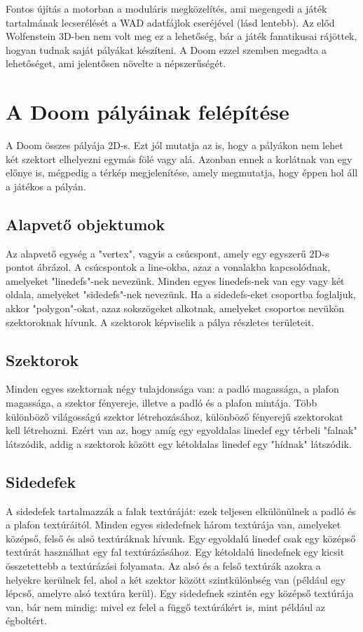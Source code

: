 \documentclass{thesis-ekf}
\theoremstyle{definition}
\theoremstyle{remark}
\begin{document}
Fontos újítás a motorban a moduláris megközelítés, ami megengedi a játék
tartalmának lecserélését a WAD adatfájlok cseréjével (lásd lentebb). Az előd
Wolfenstein 3D-ben nem volt meg ez a lehetőség, bár a játék fanatikusai
rájöttek, hogyan tudnak saját pályákat készíteni. A Doom ezzel szemben megadta
a lehetőséget, ami jelentősen növelte a népszerűségét.

\section{A Doom pályáinak felépítése}

A Doom összes pályája 2D-s. Ezt jól mutatja az is, hogy a pályákon nem lehet két
szektort elhelyezni egymás fölé vagy alá. Azonban ennek a korlátnak van egy
előnye is, mégpedig a térkép megjelenítése, amely megmutatja, hogy éppen hol áll
a játékos a pályán.

\subsection{Alapvető objektumok}

Az alapvető egység a "vertex", vagyis a csúcspont, amely egy egyszerű 2D-s
pontot ábrázol. A csúcspontok a line-okba, azaz a vonalakba kapcsolódnak,
amelyeket "linedefs"-nek nevezünk. Minden egyes linedefs-nek van egy vagy két
oldala, amelyeket "sidedefs"-nek nevezünk. Ha a sidedefs-eket csoportba
foglaljuk, akkor "polygon"-okat, azaz sokszögeket alkotnak, amelyeket csoportos
nevükön szektoroknak hívunk. A szektorok képviselik a pálya részletes
területeit.

\subsection{Szektorok}

Minden egyes szektornak négy tulajdonsága van: a padló magassága, a plafon
magassága, a szektor fényereje, illetve a padló és a plafon mintája. Több
különböző világosságú szektor létrehozásához, különböző fényerejű szektorokat
kell létrehozni. Ezért van az, hogy amíg egy egyoldalas linedef egy térbeli
"falnak" látszódik, addig a szektorok között egy kétoldalas linedef egy
"hídnak" látszódik.

\subsection{Sidedefek}

A sidedefek tartalmazzák a falak textúráját: ezek teljesen elkülönülnek a padló
és a plafon textúráitól. Minden egyes sidedefnek három textúrája van, amelyeket
középső, felső és alsó textúráknak hívunk. Egy egyoldalú linedef csak egy
középső textúrát használhat egy fal textúrázásához. Egy kétoldalú linedefnek egy
kicsit összetettebb a textúrázási folyamata. Az alsó és a felső textúrák azokra
a helyekre kerülnek fel, ahol a két szektor között szintkülönbség van (például
egy lépcső, amelyre alsó textúra kerül). Egy sidedefnek szintén egy középső
textúrája van, bár nem mindig: mivel ez felel a függő textúrákért is, mint
például az égboltért.
\end{document}
